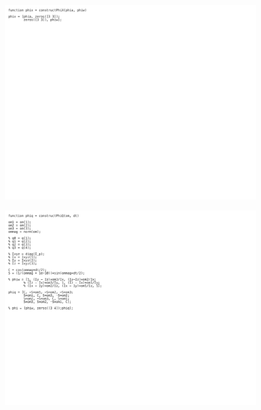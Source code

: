 \begin{figure}[H]
    \centering
    \captionsetup{ justification = centering }
    \includegraphics[trim={0cm 18cm 15cm 0cm},clip,width = 15cm]{Images/PS7/kalmanFilter-07.png}
\end{figure}

\begin{figure}[H]
    \centering
    \captionsetup{ justification = centering }
    \includegraphics[trim={0cm 9cm 15cm 0cm},clip,width = 15cm]{Images/PS7/kalmanFilter-08.png}
\end{figure}

